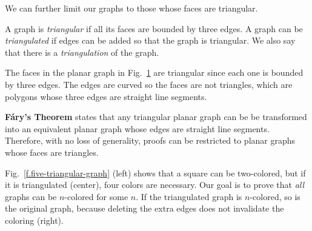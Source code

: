 \begin{figure}[t]
{
}
\label{f.five-planar-graph-map}
\label{f.five-planar-graph-graph}
\end{figure}

We can further limit our graphs to those whose faces are triangular.

\begin{definition}
A graph is \emph{triangular} if all its faces are bounded by three edges. A graph can be \emph{triangulated} if edges can be added so that the graph is triangular. We also say that there is a \emph{triangulation} of the graph.
\end{definition}

\begin{example}
The faces in the planar graph in Fig.~\ref{f.five-planar-graph-graph} are triangular since each one is bounded by three edges. The edges are curved so the faces are not triangles, which are polygons whose three edges are straight line segments.
\end{example}

\begin{advanced}
\textbf{F\'{a}ry's Theorem} states that any triangular planar graph can be be transformed into an equivalent planar graph whose edges are straight line segments. Therefore, with no loss of generality,  proofs can be restricted to  planar graphs whose faces are triangles.
\end{advanced}

\begin{example}
Fig.~\ref{f.five-triangular-graph} (left) shows that a square can be two-colored, but if it is triangulated (center), four colors are necessary. Our goal is to prove that \emph{all} graphs can be $n$-colored for some $n$. If the triangulated graph is $n$-colored, so is the original graph, because deleting the extra edges does not invalidate the coloring (right).
\end{example}

